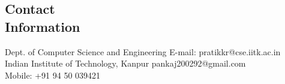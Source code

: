 \documentclass[margin,line]{resume}
\begin{document}
\begin{resume}

  \section{\mysidestyle Contact\\Information}

  Dept. of Computer Science and Engineering                            \hfill E-mail: pratikkr@cse.iitk.ac.in  \vspace{0mm}\\\vspace{0mm}%
  Indian Institute of Technology, Kanpur                               \hfill pankaj200292@gmail.com  \vspace{0mm}\\\vspace{0mm}%
                                                                       \hfill Mobile: +91 94 50 039421 \vspace{0mm}\       \vspace{0mm}\\\vspace{-4.5mm}%






\end{resume}
\end{document}
